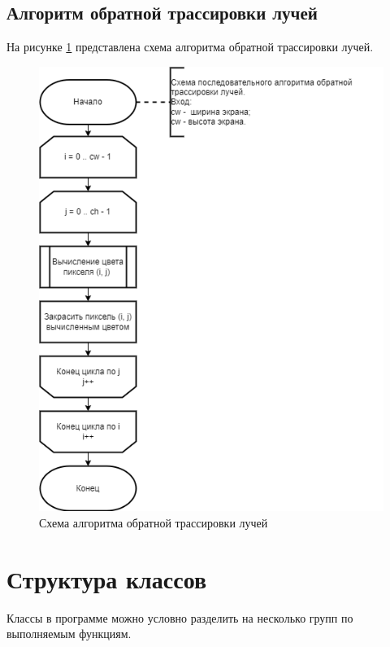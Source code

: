\subsection{Алгоритм обратной трассировки лучей}

На рисунке \ref{fig:follow} представлена схема алгоритма обратной трассировки лучей.
\begin{figure}[H]
	\centering
	\includegraphics[width=0.7\linewidth]{inc/img/follow}
	\caption{Схема алгоритма обратной трассировки лучей}
	\label{fig:follow}
\end{figure}
\newpage
\section{Структура классов}
Классы в программе можно условно разделить на несколько групп по выполняемым функциям.

